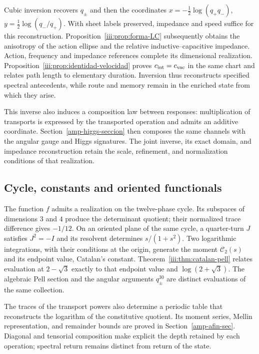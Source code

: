 Cubic inversion recovers $q_\pm$ and then the coordinates
$x=-\frac12\log(q_+q_-)$,
$y=\frac12\log(q_-/q_+)$. With sheet labels preserved, impedance
and speed suffice for this reconstruction.
Proposition~\ref{iii:prop:forma-LC} subsequently obtains the
anisotropy of the action ellipse and the relative
inductive--capacitive impedance. Action, frequency and impedance
references complete its dimensional realization.
Proposition~\ref{iii:prop:identidad-velocidad} proves
$c_{\rm int}=c_{\rm vac}$ in the same chart and relates path
length to elementary duration. Inversion thus reconstructs specified
spectral antecedents, while route and memory remain in the enriched
state from which they arise.

This inverse also induces a composition law between responses:
multiplication of transports is expressed by the transported operation
and admits an additive coordinate. Section~\ref{amp-higgs-seccion}
then composes the same channels with the angular gauge and Higgs
signatures. The joint inverse, its exact domain, and impedance
reconstruction retain the scale, refinement, and normalization
conditions of that realization.

\subsection{Cycle, constants and oriented functionals}

The function $f$ admits a realization on the twelve-phase cycle.
Its subspaces of dimensions $3$ and $4$ produce the determinant
quotient; their normalized trace difference gives $-1/12$.
On an oriented plane of the same cycle, a quarter-turn $J$ satisfies
$J^2=-I$ and its resolvent determines $s/(1+s^2)$. Two logarithmic
integrations, with their conditions at the origin, generate the moment
$\mathcal C_2(s)$ and its endpoint value, Catalan's constant.
Theorem~\ref{iii:thm:catalan-pell} relates evaluation at
$2-\sqrt3$ exactly to that endpoint value and
$\log(2+\sqrt3)$. The algebraic Pell section and the angular
arguments $q_\pm^{30}$ are distinct evaluations of the same collection.

The traces of the transport powers also determine a periodic table that
reconstructs the logarithm of the constitutive quotient. Its moment
series, Mellin representation, and remainder bounds are proved in
Section~\ref{amp-afin-sec}. Diagonal and tensorial composition make
explicit the depth retained by each operation; spectral return remains
distinct from return of the state.

